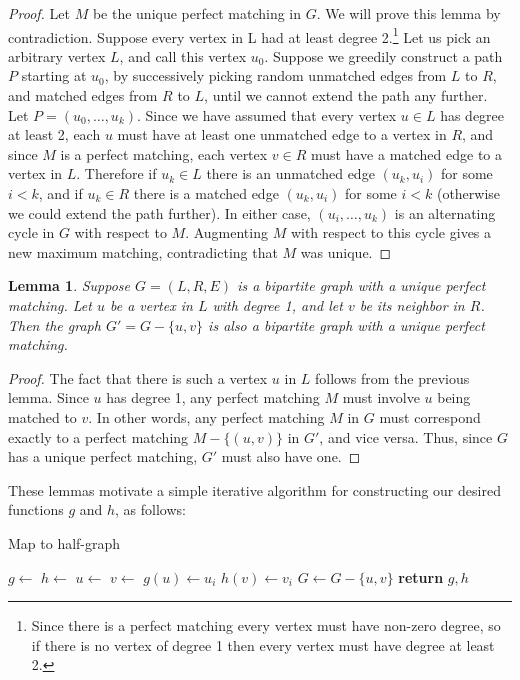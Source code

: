 \documentclass{hmcpset}
\newtheorem{lemma}{Lemma}
\begin{document}
\begin{solution}
\begin{enumerate}
\begin{proof}
  Let $M$ be the unique perfect matching in $G$. We will prove this lemma
  by contradiction. Suppose every vertex in L had at least
  degree 2.\footnote{
      Since there is a perfect matching every vertex must have non-zero degree,
      so if there is no vertex of degree 1 then every vertex must have degree
      at least 2.}
  Let us pick an arbitrary vertex $L$, and call this vertex $u_0$.
  Suppose we greedily construct a path $P$ starting at $u_0$, by successively picking
  random unmatched edges from $L$ to $R$, and matched edges from $R$ to $L$, until
  we cannot extend the path any further. Let $P = (u_0,\ldots,u_k)$.
  Since we have assumed that every vertex $u \in L$ has degree at least 2, each $u$
  must have at least one unmatched edge to a vertex in $R$, and since $M$ is a
  perfect matching, each vertex $v \in R$ must have a matched edge to a vertex in $L$.
  Therefore if $u_k \in L$ there is an unmatched edge
  $(u_k, u_i)$ for some $i < k$, and if $u_k \in R$ there is a matched edge
  $(u_k, u_i)$ for some $i < k$ (otherwise we could extend the path further).
  In either case, $(u_i,\ldots,u_k)$ is an alternating cycle in $G$ with respect
  to $M$. Augmenting $M$ with respect to this cycle gives a new maximum matching,
  contradicting that $M$ was unique.
\end{proof}

\begin{lemma}
  Suppose $G = (L, R, E)$ is a bipartite graph with a unique perfect matching. Let
  $u$ be a vertex in $L$ with degree 1, and let $v$ be its neighbor in $R$. Then
  the graph $G' = G - \{u, v\}$ is also a bipartite graph
  with a unique perfect matching.
\end{lemma}

\begin{proof}
  The fact that there is such a vertex $u$ in $L$ follows from the previous lemma.
  Since $u$ has degree 1, any perfect matching $M$ must involve $u$ being matched
  to $v$. In other words, any perfect matching $M$ in $G$ must correspond exactly to
  a perfect matching $M - \{(u, v)\}$ in $G'$, and vice versa. Thus, since $G$ has a
  unique perfect matching, $G'$ must also have one.
\end{proof}

These lemmas motivate a simple iterative algorithm for constructing our desired
functions $g$ and $h$, as follows:

\begin{algorithm}
  \caption{Map to half-graph}
  \begin{algorithmic}[1]
    \State $g\gets$ 
    \State $h\gets$ 
      \State $u\gets$ 
      \State $v\gets$ 
      \State $g(u)\gets u_i$
      \State $h(v)\gets v_i$
      \State $G\gets G - \{u, v\}$
    \EndFor
    \State \textbf{return} $g, h$
    \EndProcedure
  \end{algorithmic}
\end{algorithm}


\end{enumerate}
\end{solution}
\end{document}
